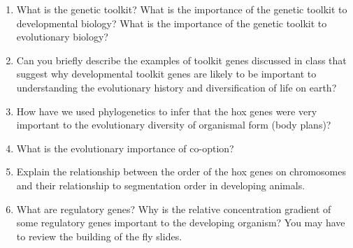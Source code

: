 \documentclass[letterpaper]{tufte-handout}
\begin{document}
\begin{enumerate}
	\item What is the genetic toolkit?  What is the importance of the genetic toolkit to developmental biology?  What is the importance of the genetic toolkit to evolutionary biology?  

	\item Can you briefly describe the examples of toolkit genes discussed in class that suggest why developmental toolkit genes are likely to be important to understanding the evolutionary history and diversification of life on earth?

	\item How have we used phylogenetics to infer that the hox genes were very important to the evolutionary diversity of organismal form (body plans)?

	\item What is the evolutionary importance of co-option?

	\item Explain the relationship between the order of the hox genes on chromosomes and their relationship to segmentation order in developing animals.

	\item What are regulatory genes?  Why is the relative concentration gradient of some regulatory genes important to the developing organism?  You may have to review the building of the fly slides.

\end{enumerate}
\end{document}
